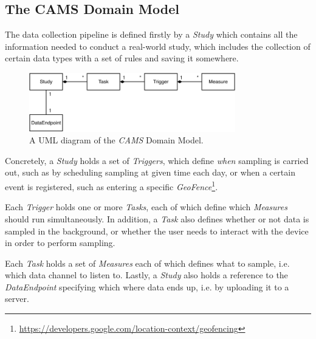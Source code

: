 \subsection{The CAMS Domain Model}
The data collection pipeline is defined firstly by a \textit{Study} which contains all the information needed to conduct a real-world study, which includes the collection of certain data types with a set of rules and saving it somewhere. 

\begin{figure}[h]
    \centering
    \includegraphics[width=0.8\textwidth]{images/CAMS-UML.pdf}
    \caption{A UML diagram of the \textit{CAMS} Domain Model.}
    \label{fig:cams_uml}
\end{figure}

Concretely, a \textit{Study} holds a set of \textit{Triggers}, which define \textit{when} sampling is carried out, such as by scheduling sampling at  given time each day, or when a certain event is registered, such as entering a specific \textit{GeoFence}\footnote{\url{https://developers.google.com/location-context/geofencing}}. 

Each \textit{Trigger} holds one or more \textit{Tasks}, each of which define which \textit{Measures} should run simultaneously. In addition, a \textit{Task} also defines whether or not data is sampled in the background, or whether the user needs to interact with the device in order to perform sampling. 

Each \textit{Task} holds a set of \textit{Measures} each of which defines what to sample, i.e. which data channel to listen to. Lastly, a \textit{Study} also holds a reference to the \textit{DataEndpoint} specifying which where data ends up, i.e. by uploading it to a server.


